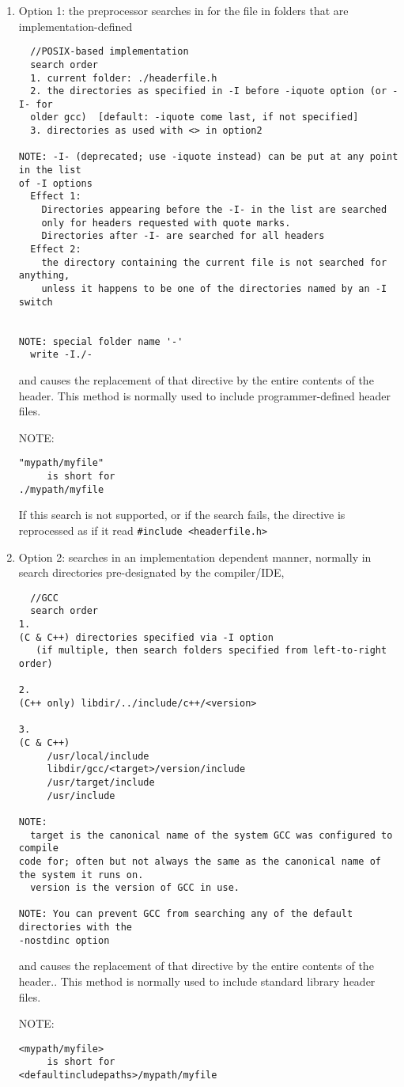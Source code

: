 \begin{enumerate}
  \item Option 1:
  the preprocessor searches in for the file in folders that are
  implementation-defined
  \begin{verbatim}
  //POSIX-based implementation
  search order
  1. current folder: ./headerfile.h
  2. the directories as specified in -I before -iquote option (or -I- for
  older gcc)  [default: -iquote come last, if not specified] 
  3. directories as used with <> in option2
  
NOTE: -I- (deprecated; use -iquote instead) can be put at any point in the list
of -I options 
  Effect 1:
    Directories appearing before the -I- in the list are searched
    only for headers requested with quote marks.
    Directories after -I- are searched for all headers
  Effect 2:
    the directory containing the current file is not searched for anything,
    unless it happens to be one of the directories named by an -I switch
    
    
NOTE: special folder name '-'
  write -I./-    
  \end{verbatim}
  and causes the replacement of that directive by the
  entire contents of the header. This method is normally used to include programmer-defined header files.
  
NOTE: 
\begin{verbatim}
"mypath/myfile" 
     is short for 
./mypath/myfile
\end{verbatim}  
  
  If this search is not supported, or if the search fails, the directive is
  reprocessed as if it read \verb!#include <headerfile.h>!
  
  \item Option 2:
   searches in an implementation dependent manner, normally in search
  directories pre-designated by the compiler/IDE, 

\begin{verbatim}
  //GCC
  search order
1.
(C & C++) directories specified via -I option
   (if multiple, then search folders specified from left-to-right order)

2.     
(C++ only) libdir/../include/c++/<version>

3.
(C & C++)
     /usr/local/include
     libdir/gcc/<target>/version/include
     /usr/target/include
     /usr/include
     
NOTE: 
  target is the canonical name of the system GCC was configured to compile
code for; often but not always the same as the canonical name of the system it runs on. 
  version is the version of GCC in use.
  
NOTE: You can prevent GCC from searching any of the default directories with the
-nostdinc option
\end{verbatim}
  and causes the replacement of
  that directive by the entire contents of the header.. This method is normally
  used to include standard library header files.
  
NOTE:
\begin{verbatim}
<mypath/myfile> 
     is short for 
<defaultincludepaths>/mypath/myfile
\end{verbatim}
  
\end{enumerate}
